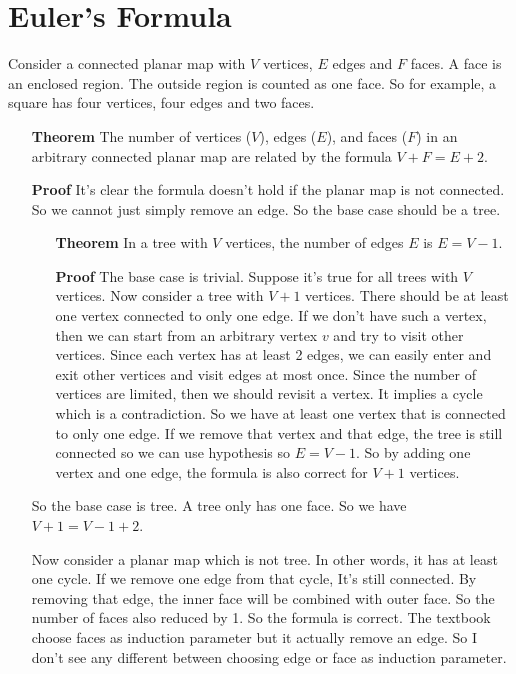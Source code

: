 \documentclass{book}
\begin{document}
	\section{Euler's Formula}
	Consider a connected planar map with $V$ vertices, $E$ edges and $F$ faces. A face is an enclosed region. The outside region is counted as one face. So for example, a square has four vertices, four edges and two faces.
	\begin{itemize}
		\item[\textbf{Theorem}] The number of vertices ($V$), edges ($E$), and faces ($F$) in an arbitrary connected planar map are related by the formula $V + F = E + 2$.
		\item[\textbf{Proof}] It's clear the formula doesn't hold if the planar map is not connected. So we cannot just simply remove an edge. So the base case should be a tree.
		\begin{itemize}
			\item[\textbf{Theorem}] In a tree with $V$ vertices, the number of edges $E$ is $E = V - 1$.
			\item[\textbf{Proof}] The base case is trivial. Suppose it's true for all trees with $V$ vertices. Now consider a tree with $V + 1$ vertices. There should be at least one vertex connected to only one edge. If we don't have such a vertex, then we can start from an arbitrary vertex $v$ and try to visit other vertices. Since each vertex has at least 2 edges, we can easily enter and exit other vertices and visit edges at most once. Since the number of vertices are limited, then we should revisit a vertex. It implies a cycle which is a contradiction. So we have at least one vertex that is connected to only one edge. If we remove that vertex and that edge, the tree is still connected so we can use hypothesis so $E = V - 1$. So by adding one vertex and one edge, the formula is also correct for $V + 1$ vertices.
		\end{itemize}
			So the base case is tree. A tree only has one face. So we have $V + 1 = V - 1 + 2$. 
			\par Now consider a planar map which is not tree. In other words, it has at least one cycle. If we remove one edge from that cycle, It's still connected. By removing that edge, the inner face will be combined with outer face. So the number of faces also reduced by 1. So the formula is correct. The textbook choose faces as induction parameter but it actually remove an edge. So I don't see any different between choosing edge or face as induction parameter.
	\end{itemize}
\end{document}
